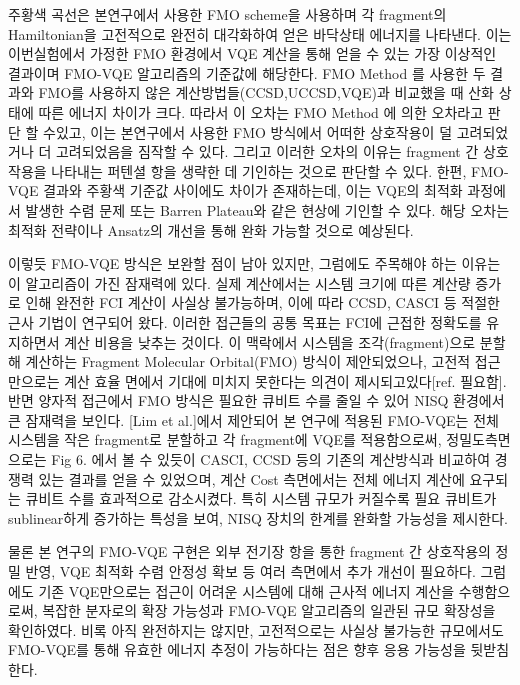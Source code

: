 \documentclass[pdflatex,sn-mathphys-num]{sn-jnl}%
\theoremstyle{thmstyleone}%
\theoremstyle{thmstyletwo}%
\theoremstyle{thmstylethree}%
\begin{document}
주황색 곡선은 본연구에서 사용한 FMO scheme을 사용하며 각 fragment의 Hamiltonian을 고전적으로 완전히 대각화하여 얻은 바닥상태 에너지를 나타낸다. 이는 이번실험에서 가정한 FMO 환경에서 VQE 계산을 통해 얻을 수 있는 가장 이상적인 결과이며 FMO-VQE 알고리즘의 기준값에 해당한다. FMO Method 를 사용한 두 결과와 FMO를 사용하지 않은 계산방법들(CCSD,UCCSD,VQE)과 비교했을 때 산화 상태에 따른 에너지 차이가 크다. 따라서 이 오차는 FMO Method 에 의한 오차라고 판단 할 수있고, 이는 본연구에서 사용한 FMO 방식에서 어떠한 상호작용이 덜 고려되었거나 더 고려되었음을 짐작할 수 있다. 그리고 이러한 오차의 이유는 fragment 간 상호작용을 나타내는 퍼텐셜 항을 생략한 데 기인하는 것으로 판단할 수 있다. 한편, FMO-VQE 결과와 주황색 기준값 사이에도 차이가 존재하는데, 이는 VQE의 최적화 과정에서 발생한 수렴 문제 또는 Barren Plateau와 같은 현상에 기인할 수 있다. 해당 오차는 최적화 전략이나 Ansatz의 개선을 통해 완화 가능할 것으로 예상된다.

이렇듯 FMO-VQE 방식은 보완할 점이 남아 있지만, 그럼에도 주목해야 하는 이유는 이 알고리즘이 가진 잠재력에 있다. 실제 계산에서는 시스템 크기에 따른 계산량 증가로 인해 완전한 FCI 계산이 사실상 불가능하며, 이에 따라 CCSD, CASCI 등 적절한 근사 기법이 연구되어 왔다. 이러한 접근들의 공통 목표는 FCI에 근접한 정확도를 유지하면서 계산 비용을 낮추는 것이다. 이 맥락에서 시스템을 조각(fragment)으로 분할해 계산하는 Fragment Molecular Orbital(FMO) 방식이 제안되었으나, 고전적 접근만으로는 계산 효율 면에서 기대에 미치지 못한다는 의견이 제시되고있다[ref. 필요함].
반면 양자적 접근에서 FMO 방식은 필요한 큐비트 수를 줄일 수 있어 NISQ 환경에서 큰 잠재력을 보인다. 
[Lim et al.]에서 제안되어 본 연구에 적용된 FMO-VQE는 전체 시스템을 작은 fragment로 분할하고 각 fragment에 VQE를 적용함으로써,
정밀도측면으로는 Fig 6. 에서 볼 수 있듯이 CASCI, CCSD 등의 기존의 계산방식과 비교하여 경쟁력 있는 결과를 얻을 수 있었으며, 계산 Cost 측면에서는 
전체 에너지 계산에 요구되는 큐비트 수를 효과적으로 감소시켰다. 특히 시스템 규모가 커질수록 필요 큐비트가 sublinear하게 증가하는 특성을 보여, NISQ 장치의 한계를 완화할 가능성을 제시한다.

물론 본 연구의 FMO-VQE 구현은 외부 전기장 항을 통한 fragment 간 상호작용의 정밀 반영, VQE 최적화 수렴 안정성 확보 등 여러 측면에서 추가 개선이 필요하다. 그럼에도 기존 VQE만으로는 접근이 어려운 시스템에 대해 근사적 에너지 계산을 수행함으로써, 복잡한 분자로의 확장 가능성과 FMO-VQE 알고리즘의 일관된 규모 확장성을 확인하였다. 비록 아직 완전하지는 않지만, 고전적으로는 사실상 불가능한 규모에서도 FMO-VQE를 통해 유효한 에너지 추정이 가능하다는 점은 향후 응용 가능성을 뒷받침한다.
\end{document}

